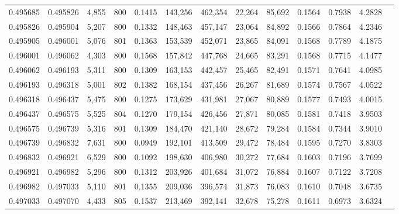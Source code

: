\begin{tabular}{rrrrrrrrrrrrr}
0.495685 & 0.495826 & 4,855 & 800 &                                     0.1415 & 143,256 & 462,354 &  22,264 &  85,692 & 0.1564 & 0.7938 & 4.2828 \\
0.495826 & 0.495904 & 5,207 & 800 &                                     0.1332 & 148,463 & 457,147 &  23,064 &  84,892 & 0.1566 & 0.7864 & 4.2346 \\
0.495905 & 0.496001 & 5,076 & 801 &                                     0.1363 & 153,539 & 452,071 &  23,865 &  84,091 & 0.1568 & 0.7789 & 4.1875 \\
0.496001 & 0.496062 & 4,303 & 800 &                                     0.1568 & 157,842 & 447,768 &  24,665 &  83,291 & 0.1568 & 0.7715 & 4.1477 \\
0.496062 & 0.496193 & 5,311 & 800 &                                     0.1309 & 163,153 & 442,457 &  25,465 &  82,491 & 0.1571 & 0.7641 & 4.0985 \\
0.496193 & 0.496318 & 5,001 & 802 &                                     0.1382 & 168,154 & 437,456 &  26,267 &  81,689 & 0.1574 & 0.7567 & 4.0522 \\
0.496318 & 0.496437 & 5,475 & 800 &                                     0.1275 & 173,629 & 431,981 &  27,067 &  80,889 & 0.1577 & 0.7493 & 4.0015 \\
0.496437 & 0.496575 & 5,525 & 804 &                                     0.1270 & 179,154 & 426,456 &  27,871 &  80,085 & 0.1581 & 0.7418 & 3.9503 \\
0.496575 & 0.496739 & 5,316 & 801 &                                     0.1309 & 184,470 & 421,140 &  28,672 &  79,284 & 0.1584 & 0.7344 & 3.9010 \\
0.496739 & 0.496832 & 7,631 & 800 &                                     0.0949 & 192,101 & 413,509 &  29,472 &  78,484 & 0.1595 & 0.7270 & 3.8303 \\
0.496832 & 0.496921 & 6,529 & 800 &                                     0.1092 & 198,630 & 406,980 &  30,272 &  77,684 & 0.1603 & 0.7196 & 3.7699 \\
0.496921 & 0.496982 & 5,296 & 800 &                                     0.1312 & 203,926 & 401,684 &  31,072 &  76,884 & 0.1607 & 0.7122 & 3.7208 \\
0.496982 & 0.497033 & 5,110 & 801 &                                     0.1355 & 209,036 & 396,574 &  31,873 &  76,083 & 0.1610 & 0.7048 & 3.6735 \\
0.497033 & 0.497070 & 4,433 & 805 &                                     0.1537 & 213,469 & 392,141 &  32,678 &  75,278 & 0.1611 & 0.6973 & 3.6324 \\

\end{tabular}
